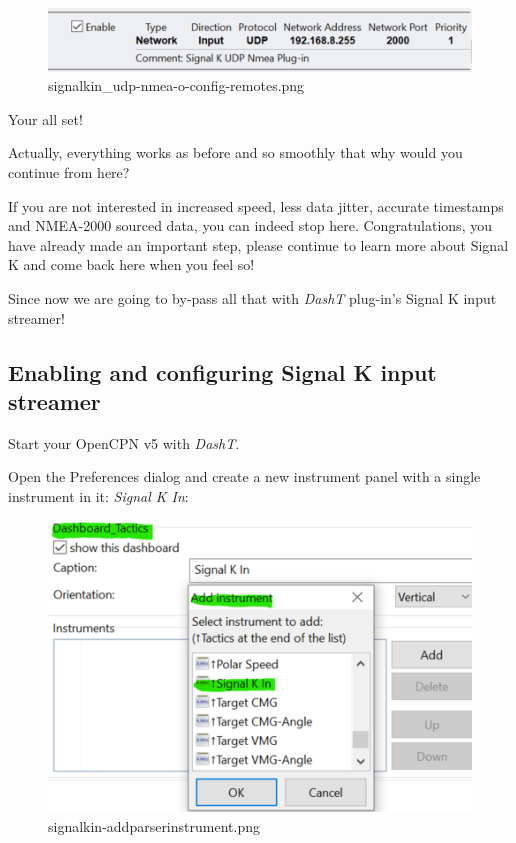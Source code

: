 \documentclass[11pt]{article}
\begin{document}
    \begin{figure}
\centering
\includegraphics{signalkin_udp-nmea-o-config-remotes.png}
\caption{signalkin\_udp-nmea-o-config-remotes.png}
\end{figure}

    

    Your all set!

    Actually, everything works as before and so smoothly that why would you
continue from here?

    If you are not interested in increased speed, less data jitter, accurate
timestamps and NMEA-2000 sourced data, you can indeed stop here.
Congratulations, you have already made an important step, please
continue to learn more about Signal K and come back here when you feel
so!

    Since now we are going to by-pass all that with \emph{DashT} plug-in's
Signal K input streamer!

    \hypertarget{enabling-and-configuring-signal-k-input-streamer}{%
\subsection{Enabling and configuring Signal K input
streamer}\label{enabling-and-configuring-signal-k-input-streamer}}

    Start your OpenCPN v5 with \emph{DashT}.

    Open the Preferences dialog and create a new instrument panel with a
single instrument in it: \emph{Signal K In}:

    \begin{figure}
\centering
\includegraphics{signalkin-addparserinstrument.png}
\caption{signalkin-addparserinstrument.png}
\end{figure}
\end{document}
